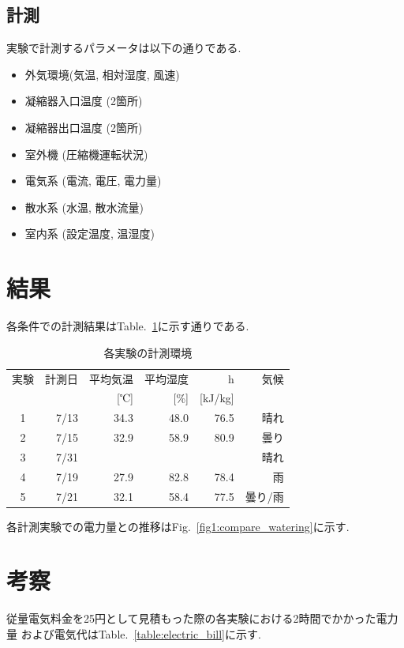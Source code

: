 \documentclass[a4j,fleqn,dvipdfmx,uplatex]{jsarticle}
\newcommand{\figref}[1]{Fig.\ \ref{#1}}
\newcommand{\tableref}[1]{Table.\ \ref{#1}}
\begin{document}
\subsection{計測}
実験で計測するパラメータは以下の通りである. 

\begin{itemize}
  \item 外気環境(気温, 相対湿度, 風速)
  \item 凝縮器入口温度 (2箇所)
  \item 凝縮器出口温度 (2箇所)
  \item 室外機 (圧縮機運転状況)
  \item 電気系 (電流, 電圧, 電力量)
  \item 散水系 (水温, 散水流量)
  \item 室内系 (設定温度, 温湿度)
\end{itemize}


\section{結果}\label{sec3}
各条件での計測結果は\tableref{table:ex}に示す通りである. 

\begin{table}[htb]
  \caption{各実験の計測環境}
  \label{table:ex}
  \centering
  \begin{tabular}{crrrrr}
    \small 実験 & \small 計測日 & \small 平均気温 & \small 平均湿度 & \small h & \small 気候 \\[-1.5mm]
     & & \small [℃] & \small [\%] & \small [kJ/kg] &  \\
    \hline \hline
    1 & 7/13 & 34.3 & 48.0 & 76.5 & 晴れ  \\
    2 & 7/15 & 32.9 & 58.9 & 80.9 & 曇り \\
    3 & 7/31 &  &  &  & 晴れ \\
    4 & 7/19 & 27.9 & 82.8 & 78.4 & 雨 \\
    5 & 7/21 & 32.1 & 58.4 & 77.5 & 曇り/雨 \\
    \hline
  \end{tabular}
\end{table}

各計測実験での電力量との推移は\figref{fig1:compare_watering}に示す. 

\section{考察}
従量電気料金を25円として見積もった際の各実験における2時間でかかった電力量
および電気代は\tableref{table:electric_bill}に示す. 
\end{document}
